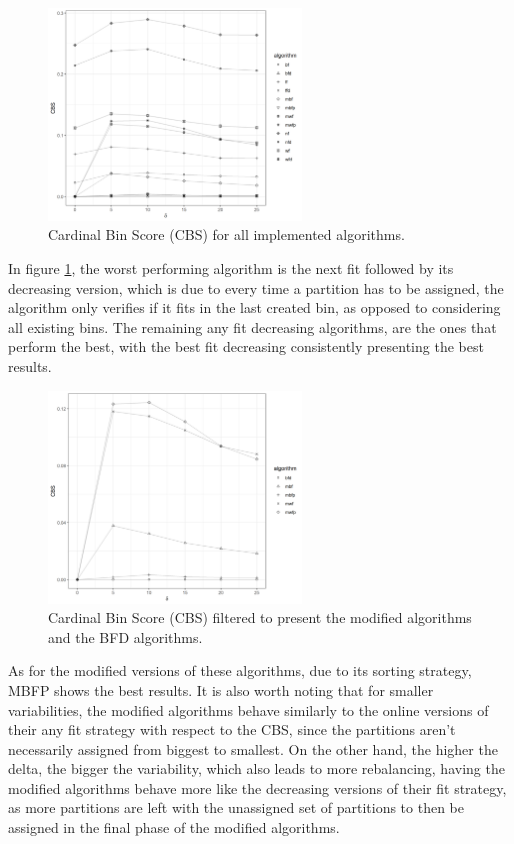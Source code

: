 \begin{figure}[htb!] 
\centering
\includegraphics[width=0.6\textwidth]{images/controller/relative.png} 
\caption{
    Cardinal Bin Score (CBS) for all implemented algorithms.
} 
\label{fig:relative_nconsumers} 
\end{figure}

In figure \ref{fig:relative_nconsumers}, the worst performing algorithm is the
next fit followed by its decreasing version, which is due to every time a
partition has to be assigned, the algorithm only verifies if it fits in the last
created bin, as opposed to considering all existing bins. The remaining any fit
decreasing algorithms, are the ones that perform the best, with the best fit
decreasing consistently presenting the best results. 

\begin{figure}[htb!] 
\centering
\includegraphics[width=0.6\textwidth]{images/controller/filtered_relative.png} 
\caption{
    Cardinal Bin Score (CBS) filtered to present the modified algorithms and the
    BFD algorithms.
} 
\label{fig:relative_nconsumers_modified} 
\end{figure}

As for the modified versions of these algorithms, due to its sorting strategy,
MBFP shows the best results. It is also worth noting that for smaller
variabilities, the modified algorithms behave similarly to the online versions
of their any fit strategy with respect to the CBS, since the partitions aren't
necessarily assigned from biggest to smallest. On the other hand, the higher the
delta, the bigger the variability, which also leads to more rebalancing, having
the modified algorithms behave more like the decreasing versions of their fit
strategy, as more partitions are left with the unassigned set of partitions to
then be assigned in the final phase of the modified algorithms.

